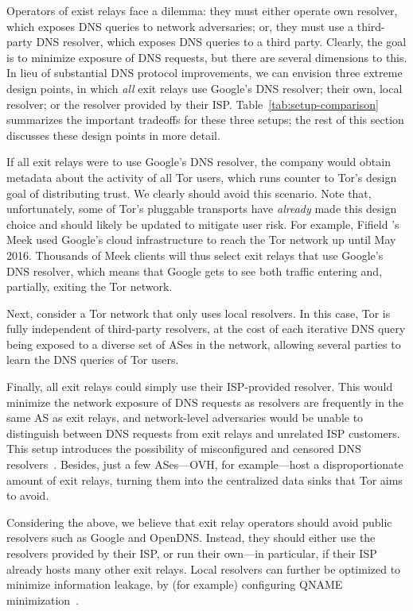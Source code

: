 Operators of exist relays face a dilemma: they must either operate own
resolver, which exposes DNS queries to network adversaries; or, they
must use a third-party DNS resolver, which exposes DNS queries to a
third party.  Clearly, the goal is to minimize exposure of DNS requests,
but there are several dimensions to this.  In lieu of substantial DNS
protocol improvements, we can envision three extreme design points,
in which \emph{all} exit relays use \first Google's DNS resolver;
\second their own, local resolver; or \third the resolver provided by
their ISP.  Table~\ref{tab:setup-comparison}
summarizes the important tradeoffs for these three setups; the rest of
this section discusses these design points in more detail.

If all exit relays were to use Google's DNS resolver, the company would
obtain metadata about the activity of all Tor users, which runs counter to
Tor's design goal of distributing trust.  We clearly should avoid this
scenario. Note that, unfortunately, some of Tor's pluggable transports
have {\em already} made this design choice and should likely be updated
to mitigate user risk.  For example, Fifield \ea's~\cite{Fifield2015a}
Meek used Google's cloud infrastructure 
to reach the Tor network up until May 2016.
Thousands of Meek clients
will thus select exit relays that use Google's DNS resolver, which means that Google
gets to see both traffic entering and, partially, exiting the Tor
network. 

Next, consider a Tor network that only uses local resolvers.  In this
case, Tor is fully independent of third-party resolvers, at the cost of
each iterative DNS query being exposed to a diverse set of ASes in the
network, allowing several parties to learn the DNS queries of Tor users.

Finally, all exit
relays could simply use their ISP-provided resolver.  This would minimize the
network exposure of DNS requests as resolvers are frequently in the same AS as
exit relays, and network-level adversaries would be unable to distinguish
between DNS requests from exit relays and unrelated ISP customers.  This
setup introduces the possibility of misconfigured and censored DNS
resolvers~\cite[\S~4.1]{Winter2014b}.  Besides, just a few ASes---OVH, for
example---host a disproportionate amount of exit relays, turning them into the
centralized data sinks that Tor aims to avoid.   

Considering the above, we believe that exit relay operators should avoid
public resolvers such as Google and OpenDNS.  Instead, they should
either use the resolvers provided by their ISP, or run their own---in
particular, if their ISP already hosts many other exit relays.  Local
resolvers can further be optimized to minimize information leakage,
by (for example) configuring QNAME minimization~\cite{qname-minimization}. 

